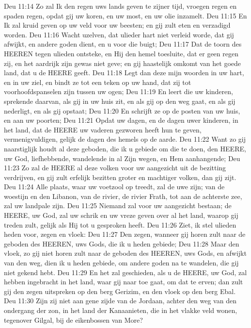 Deu 11:14  Zo zal Ik den regen uws lands geven te zijner tijd, vroegen regen en spaden regen, opdat gij uw koren, en uw most, en uw olie inzamelt.
Deu 11:15  En Ik zal kruid geven op uw veld voor uw beesten; en gij zult eten en verzadigd worden.
Deu 11:16  Wacht uzelven, dat ulieder hart niet verleid worde, dat gij afwijkt, en andere goden dient, en u voor die buigt;
Deu 11:17  Dat de toorn des HEEREN tegen ulieden ontsteke, en Hij den hemel toesluite, dat er geen regen zij, en het aardrijk zijn gewas niet geve; en gij haastelijk omkomt van het goede land, dat u de HEERE geeft.
Deu 11:18  Legt dan deze mijn woorden in uw hart, en in uw ziel, en bindt ze tot een teken op uw hand, dat zij tot voorhoofdspanselen zijn tussen uw ogen;
Deu 11:19  En leert die uw kinderen, sprekende daarvan, als gij in uw huis zit, en als gij op den weg gaat, en als gij nederligt, en als gij opstaat;
Deu 11:20  En schrijft ze op de posten van uw huis, en aan uw poorten;
Deu 11:21  Opdat uw dagen, en de dagen uwer kinderen, in het land, dat de HEERE uw vaderen gezworen heeft hun te geven, vermenigvuldigen, gelijk de dagen des hemels op de aarde.
Deu 11:22  Want zo gij naarstiglijk houdt al deze geboden, die ik u gebiede om die te doen, den HEERE, uw God, liefhebbende, wandelende in al Zijn wegen, en Hem aanhangende;
Deu 11:23  Zo zal de HEERE al deze volken voor uw aangezicht uit de bezitting verdrijven, en gij zult erfelijk bezitten groter en machtiger volken, dan gij zijt.
Deu 11:24  Alle plaats, waar uw voetzool op treedt, zal de uwe zijn; van de woestijn en den Libanon, van de rivier, de rivier Frath, tot aan de achterste zee, zal uw landpale zijn.
Deu 11:25  Niemand zal voor uw aangezicht bestaan; de HEERE, uw God, zal uw schrik en uw vreze geven over al het land, waarop gij treden zult, gelijk als Hij tot u gesproken heeft.
Deu 11:26  Ziet, ik stel ulieden heden voor, zegen en vloek:
Deu 11:27  Den zegen, wanneer gij horen zult naar de geboden des HEEREN, uws Gods, die ik u heden gebiede;
Deu 11:28  Maar den vloek, zo gij niet horen zult naar de geboden des HEEREN, uws Gods, en afwijkt van den weg, dien ik u heden gebiede, om andere goden na te wandelen, die gij niet gekend hebt.
Deu 11:29  En het zal geschieden, als u de HEERE, uw God, zal hebben ingebracht in het land, waar gij naar toe gaat, om dat te erven; dan zult gij den zegen uitspreken op den berg Gerizim, en den vloek op den berg Ebal.
Deu 11:30  Zijn zij niet aan gene zijde van de Jordaan, achter den weg van den ondergang der zon, in het land der Kanaanieten, die in het vlakke veld wonen, tegenover Gilgal, bij de eikenbossen van More?
